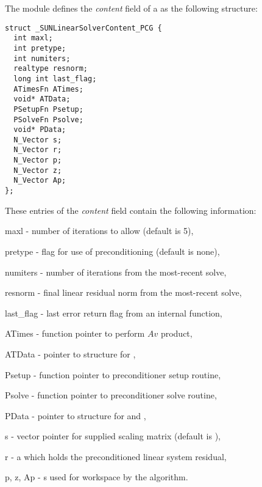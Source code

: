 The {\sunlinsolpcg} module defines the \textit{content} field of a
 as the following structure:
\begin{verbatim}
struct _SUNLinearSolverContent_PCG {
  int maxl;
  int pretype;
  int numiters;
  realtype resnorm;
  long int last_flag;
  ATimesFn ATimes;
  void* ATData;
  PSetupFn Psetup;
  PSolveFn Psolve;
  void* PData;
  N_Vector s;
  N_Vector r;
  N_Vector p;
  N_Vector z;
  N_Vector Ap;
};
\end{verbatim}
These entries of the \emph{content} field contain the following
information:
\begin{args}
  \item[maxl] - number of {\pcg} iterations to allow (default is 5),
  \item[pretype] - flag for use of preconditioning (default is none),
  \item[numiters] - number of iterations from the most-recent solve,
  \item[resnorm] - final linear residual norm from the most-recent solve,
  \item[last\_flag] - last error return flag from an internal function,
  \item[ATimes] - function pointer to perform $Av$ product,
  \item[ATData] - pointer to structure for ,
  \item[Psetup] - function pointer to preconditioner setup routine,
  \item[Psolve] - function pointer to preconditioner solve routine,
  \item[PData] - pointer to structure for  and ,
  \item[s] - vector pointer for supplied scaling matrix
    (default is ),
  \item[r] - a {\nvector} which holds the preconditioned linear system
    residual,
  \item[p, z, Ap] - {\nvector}s used for workspace by the
    {\pcg} algorithm.
\end{args}

